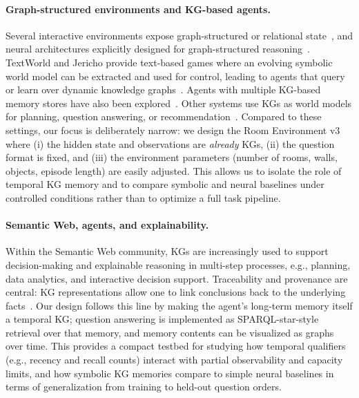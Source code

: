 \documentclass[11pt]{article}
\begin{document}
\paragraph{Graph-structured environments and KG-based agents.}
Several interactive environments expose graph-structured or relational state~\cite{chaplot2020neuraltopologicalslamvisual}, and neural architectures explicitly designed for graph-structured reasoning~\cite{yun2020graphtransformernetworks}.
TextWorld and Jericho provide text-based games where an evolving symbolic world
model can be extracted and used for control, leading to agents that query or learn
over dynamic knowledge graphs~\cite{Cote2018TextWorld,Hausknecht2020Jericho,Ammanabrolu2020Graph,oh2017valuepredictionnetwork}. Agents with multiple KG-based memory stores have also been explored~\cite{10.1609/aaai.v37i1.25075}. Other systems use KGs as world models for planning, question answering, or recommendation~\cite{Hogan_2021,ehrlinger2016towards,bordes2015largescalesimplequestionanswering,yih-etal-2015-semantic}. Compared to these settings, our focus is deliberately narrow: we design the Room Environment v3 where (i) the hidden state and observations are \emph{already} KGs, (ii) the question format is fixed, and (iii) the environment parameters (number of rooms, walls, objects, episode length) are easily adjusted. This allows us to isolate the role of temporal KG memory and to compare symbolic and neural baselines under controlled conditions rather than to optimize a full
task pipeline.

\paragraph{Semantic Web, agents, and explainability.}
Within the Semantic Web community, KGs are increasingly used to support
decision-making and explainable reasoning in multi-step processes, e.g., planning, data analytics, and interactive decision support.
Traceability and provenance are central: KG representations allow one to link
conclusions back to the underlying facts~\cite{10.1145/775152.775249}. Our design follows this line by making the agent’s long-term memory itself a temporal KG; question answering is implemented as SPARQL-star-style retrieval over that memory, and memory contents can be
visualized as graphs over time. This provides a compact testbed for studying how
temporal qualifiers (e.g., recency and recall counts) interact with partial
observability and capacity limits, and how symbolic KG memories compare to simple neural baselines in terms of generalization from training to held-out question orders.
\end{document}

